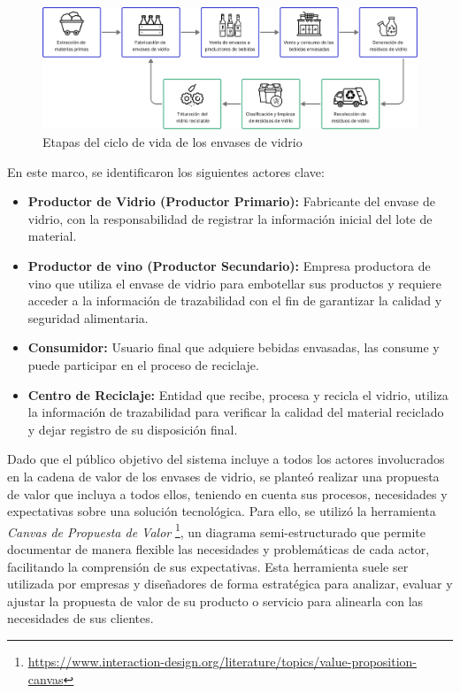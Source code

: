 \begin{figure}[!htb]
    \centering
    \includegraphics[width=\linewidth]{Figures/glass-lifecycle.png}
    \caption{Etapas del ciclo de vida de los envases de vidrio}
    \label{fig:glass-lifecycle-modelling}
\end{figure}

En este marco, se identificaron los siguientes actores clave:

\begin{itemize}
    \item \textbf{Productor de Vidrio (Productor Primario):} Fabricante del envase de vidrio, con la responsabilidad de registrar la información inicial del lote de material.
    \item \textbf{Productor de vino (Productor Secundario):} Empresa productora de vino que utiliza el envase de vidrio para embotellar sus productos y requiere acceder a la información de trazabilidad con el fin de garantizar la calidad y seguridad alimentaria.
    \item \textbf{Consumidor:} Usuario final que adquiere bebidas envasadas, las consume y puede participar en el proceso de reciclaje.
    \item \textbf{Centro de Reciclaje:} Entidad que recibe, procesa y recicla el vidrio, utiliza la información de trazabilidad para verificar la calidad del material reciclado y dejar registro de su disposición final.
\end{itemize}

Dado que el público objetivo del sistema incluye a todos los actores involucrados en la cadena de valor de los envases de vidrio, se planteó realizar una propuesta de valor que incluya a todos ellos, teniendo en cuenta sus procesos, necesidades y expectativas sobre una solución tecnológica. Para ello, se utilizó la herramienta \textit{Canvas de Propuesta de Valor} \footnote{\url{https://www.interaction-design.org/literature/topics/value-proposition-canvas}}, un diagrama semi-estructurado que permite documentar de manera flexible las necesidades y problemáticas de cada actor, facilitando la comprensión de sus expectativas. Esta herramienta suele ser utilizada por empresas y diseñadores de forma estratégica para analizar, evaluar y ajustar la propuesta de valor de su producto o servicio para alinearla con las necesidades de sus clientes.

